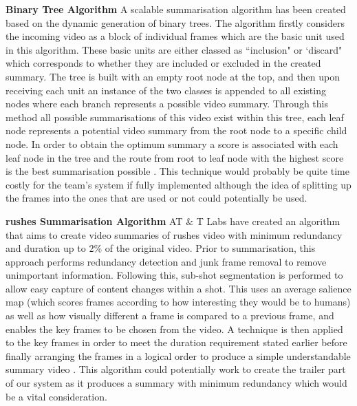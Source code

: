 \textbf{Binary Tree Algorithm}
\newline
A scalable summarisation algorithm has been created based on the dynamic generation of binary trees. The algorithm firstly 
considers the incoming video as a block of individual frames which are the basic unit used in this algorithm. These basic units are either classed as ``inclusion" or `discard" which corresponds to whether they are included or excluded in the created summary. The tree is built with an empty root node at the top, and then upon receiving each unit an instance of the two classes is appended to all existing nodes where each branch represents a possible 
video summary. Through this method all possible summarisations of this video exist within this tree, each leaf node represents a potential 
video summary from the root node to a specific child node. In order to obtain the optimum summary a score is associated with each leaf node 
in the tree and the route from root to leaf node with the highest score is the best summarisation possible \cite{ValdesMartinez}. This 
technique would probably be quite time costly for the team's system if fully implemented although the idea of splitting up the frames into the 
ones that are used or not could potentially be used. 

\textbf{rushes Summarisation Algorithm}
\newline
AT $\&$ T Labs have created an algorithm that aims to create video summaries of rushes video with minimum redundancy and duration up to 2\% 
of the original video. Prior to summarisation, this approach performs redundancy detection and junk frame removal to remove unimportant 
information. Following this, sub-shot segmentation is performed to allow easy capture of content changes within a shot. This uses an average 
salience map (which scores frames according to how interesting they would be to humans) as well as how visually different a frame is compared 
to a previous frame, and enables the key frames to be chosen from the video. A technique is then applied to the key frames in order to meet 
the duration requirement stated earlier before finally arranging the frames in a logical order to produce a simple understandable summary 
video \cite{ATandTLabsRushes}. This algorithm could potentially work to create the trailer part of our system as it produces a summary 
with minimum redundancy which would be a vital consideration. 

